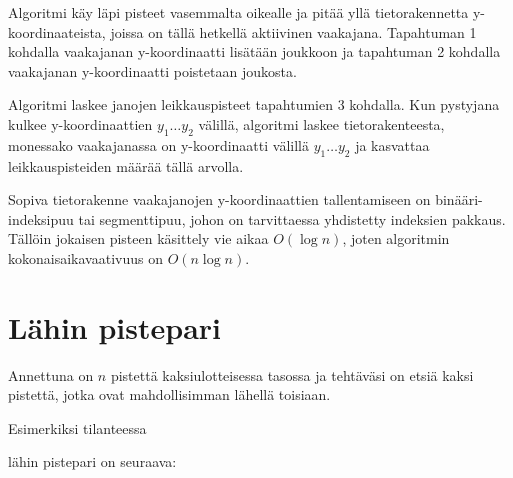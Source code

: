 Algoritmi käy läpi pisteet vasemmalta oikealle
ja pitää yllä tietorakennetta y-koordinaateista,
joissa on tällä hetkellä aktiivinen vaakajana.
Tapahtuman 1 kohdalla vaakajanan y-koordinaatti
lisätään joukkoon ja tapahtuman 2 kohdalla
vaakajanan y-koordinaatti poistetaan joukosta.

Algoritmi laskee janojen leikkauspisteet
tapahtumien 3 kohdalla.
Kun pystyjana kulkee y-koordinaattien
$y_1 \ldots y_2$ välillä,
algoritmi laskee tietorakenteesta,
monessako vaakajanassa on y-koordinaatti
välillä $y_1 \ldots y_2$ ja kasvattaa
leikkauspisteiden määrää tällä arvolla.

Sopiva tietorakenne vaakajanojen y-koordinaattien
tallentamiseen on bi\-nää\-ri-indeksipuu tai segmenttipuu,
johon on tarvittaessa yhdistetty indeksien pakkaus.
Tällöin jokaisen pisteen käsittely
vie aikaa $O(\log n)$, joten algoritmin
kokonaisaikavaativuus on $O(n \log n)$.

\section{Lähin pistepari}


\begin{task}
Annettuna on $n$ pistettä
kaksiulotteisessa tasossa
ja tehtäväsi on etsiä kaksi pistettä,
jotka ovat mahdollisimman lähellä toisiaan.
\end{task}

Esimerkiksi tilanteessa
\begin{center}
\end{center}
\begin{samepage}
lähin pistepari on seuraava:
\begin{center}
\end{center}
\end{samepage}

